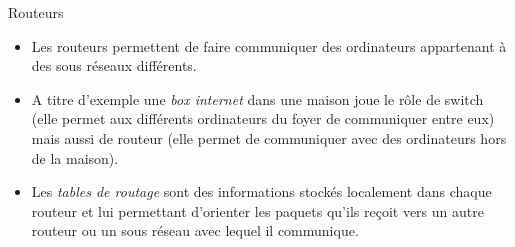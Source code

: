 \documentclass[10pt]{beamer}
\begin{document}
\begin{frame}
	\mframe{\Reseau}
	\begin{alertblock}{Routeurs}
		\begin{itemize}
			\item<1-> Les routeurs permettent de faire communiquer des ordinateurs appartenant à des sous réseaux différents.
			\item<2-> A titre d'exemple une \textit{box internet} dans une maison joue le rôle de switch (elle permet aux différents ordinateurs du foyer de communiquer entre eux) mais aussi de routeur (elle permet de communiquer avec des ordinateurs hors de la maison).
			\item<3-> Les \textit{tables de routage} sont des informations stockés localement dans chaque routeur et lui permettant d'orienter les paquets qu'ils reçoit vers un autre routeur ou un sous réseau avec lequel il communique.
		\end{itemize}
	\end{alertblock}
\end{frame}
\end{document}
